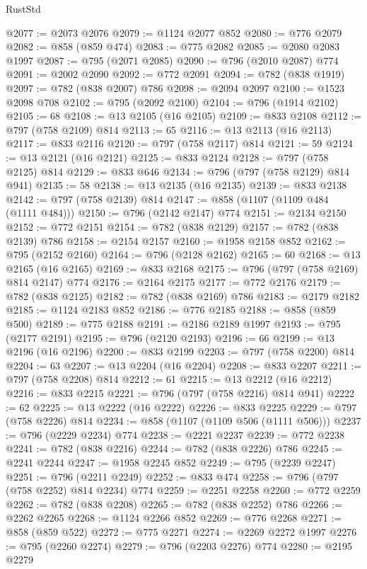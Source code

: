 \begin{lexlean}{RustStd}
\begin{coremodule}
{\begin{coremodule}
{{{{{{{{{{{{{{@2077 := @2073 @2076
@2079 := @1124 @2077 @852
@2080 := @776 @2079
@2082 := @858 (@859 @474)
@2083 := @775 @2082
@2085 := @2080 @2083 @1997
@2087 := @795 (@2071 @2085)
@2090 := @796 (@2010 @2087) @774
@2091 := @2002 @2090
@2092 := @772 @2091
@2094 := @782 (@838 @1919)
@2097 := @782 (@838 @2007) @786
@2098 := @2094 @2097
@2100 := @1523 @2098 @708
@2102 := @795 (@2092 @2100)
@2104 := @796 (@1914 @2102)
@2105 := 68
@2108 := @13 @2105 (@16 @2105)
@2109 := @833 @2108
@2112 := @797 (@758 @2109) @814
@2113 := 65
@2116 := @13 @2113 (@16 @2113)
@2117 := @833 @2116
@2120 := @797 (@758 @2117) @814
@2121 := 59
@2124 := @13 @2121 (@16 @2121)
@2125 := @833 @2124
@2128 := @797 (@758 @2125) @814
@2129 := @833 @646
@2134 := @796 (@797 (@758 @2129) @814 @941)
@2135 := 58
@2138 := @13 @2135 (@16 @2135)
@2139 := @833 @2138
@2142 := @797 (@758 @2139) @814
@2147 := @858 (@1107 (@1109 @484 (@1111 @484)))
@2150 := @796 (@2142 @2147) @774
@2151 := @2134 @2150
@2152 := @772 @2151
@2154 := @782 (@838 @2129)
@2157 := @782 (@838 @2139) @786
@2158 := @2154 @2157
@2160 := @1958 @2158 @852
@2162 := @795 (@2152 @2160)
@2164 := @796 (@2128 @2162)
@2165 := 60
@2168 := @13 @2165 (@16 @2165)
@2169 := @833 @2168
@2175 := @796 (@797 (@758 @2169) @814 @2147) @774
@2176 := @2164 @2175
@2177 := @772 @2176
@2179 := @782 (@838 @2125)
@2182 := @782 (@838 @2169) @786
@2183 := @2179 @2182
@2185 := @1124 @2183 @852
@2186 := @776 @2185
@2188 := @858 (@859 @500)
@2189 := @775 @2188
@2191 := @2186 @2189 @1997
@2193 := @795 (@2177 @2191)
@2195 := @796 (@2120 @2193)
@2196 := 66
@2199 := @13 @2196 (@16 @2196)
@2200 := @833 @2199
@2203 := @797 (@758 @2200) @814
@2204 := 63
@2207 := @13 @2204 (@16 @2204)
@2208 := @833 @2207
@2211 := @797 (@758 @2208) @814
@2212 := 61
@2215 := @13 @2212 (@16 @2212)
@2216 := @833 @2215
@2221 := @796 (@797 (@758 @2216) @814 @941)
@2222 := 62
@2225 := @13 @2222 (@16 @2222)
@2226 := @833 @2225
@2229 := @797 (@758 @2226) @814
@2234 := @858 (@1107 (@1109 @506 (@1111 @506)))
@2237 := @796 (@2229 @2234) @774
@2238 := @2221 @2237
@2239 := @772 @2238
@2241 := @782 (@838 @2216)
@2244 := @782 (@838 @2226) @786
@2245 := @2241 @2244
@2247 := @1958 @2245 @852
@2249 := @795 (@2239 @2247)
@2251 := @796 (@2211 @2249)
@2252 := @833 @474
@2258 := @796 (@797 (@758 @2252) @814 @2234) @774
@2259 := @2251 @2258
@2260 := @772 @2259
@2262 := @782 (@838 @2208)
@2265 := @782 (@838 @2252) @786
@2266 := @2262 @2265
@2268 := @1124 @2266 @852
@2269 := @776 @2268
@2271 := @858 (@859 @522)
@2272 := @775 @2271
@2274 := @2269 @2272 @1997
@2276 := @795 (@2260 @2274)
@2279 := @796 (@2203 @2276) @774
@2280 := @2195 @2279
}}}}}}}}}}}}}}
\end{coremodule}}
\end{coremodule}
\end{lexlean}
